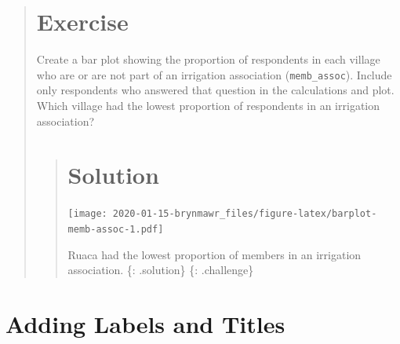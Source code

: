 \documentclass[]{book}
\newenvironment{Shaded}{\begin{snugshade}}{\end{snugshade}}
\newcommand{\KeywordTok}[1]{\textcolor[rgb]{0.13,0.29,0.53}{\textbf{#1}}}
\newcommand{\DataTypeTok}[1]{\textcolor[rgb]{0.13,0.29,0.53}{#1}}
\newcommand{\StringTok}[1]{\textcolor[rgb]{0.31,0.60,0.02}{#1}}
\newcommand{\OperatorTok}[1]{\textcolor[rgb]{0.81,0.36,0.00}{\textbf{#1}}}
\newcommand{\NormalTok}[1]{#1}
\begin{document}
\begin{quote}
\section{Exercise}\label{exercise-14}

Create a bar plot showing the proportion of respondents in each village
who are or are not part of an irrigation association
(\texttt{memb\_assoc}). Include only respondents who answered that
question in the calculations and plot. Which village had the lowest
proportion of respondents in an irrigation association?

\begin{quote}
\section{Solution}\label{solution-20}

\begin{Shaded}
\end{Shaded}

\texttt{[image: 2020-01-15-brynmawr\_files/figure-latex/barplot-memb-assoc-1.pdf]}

Ruaca had the lowest proportion of members in an irrigation association.
\{: .solution\} \{: .challenge\}
\end{quote}
\end{quote}

\section{Adding Labels and Titles}\label{adding-labels-and-titles}
\end{document}
